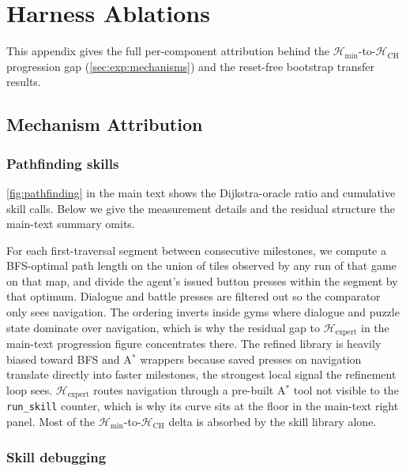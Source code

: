 \section{Harness Ablations}\label{app:ablations}

This appendix gives the full per-component attribution behind the $\mathcal{H}_{\min}$-to-$\mathcal{H}_\mathrm{CH}$ progression gap (\cref{sec:exp:mechanisms}) and the reset-free bootstrap transfer results.

\subsection{Mechanism Attribution}\label{app:mechanisms}

\subsubsection{Pathfinding skills}\label{app:mechanisms:pathfinding}

\cref{fig:pathfinding} in the main text shows the Dijkstra-oracle ratio and cumulative skill calls. Below we give the measurement details and the residual structure the main-text summary omits.

For each first-traversal segment between consecutive milestones, we compute a BFS-optimal path length on the union of tiles observed by any run of that game on that map, and divide the agent's issued button presses within the segment by that optimum. Dialogue and battle presses are filtered out so the comparator only sees navigation. The ordering inverts inside gyms where dialogue and puzzle state dominate over navigation, which is why the residual gap to $\mathcal{H}_\mathrm{expert}$ in the main-text progression figure concentrates there. The refined library is heavily biased toward BFS and A$^*$ wrappers because saved presses on navigation translate directly into faster milestones, the strongest local signal the refinement loop sees. $\mathcal{H}_\mathrm{expert}$ routes navigation through a pre-built A$^*$ tool not visible to the \texttt{run\_skill} counter, which is why its curve sits at the floor in the main-text right panel. Most of the $\mathcal{H}_{\min}$-to-$\mathcal{H}_\mathrm{CH}$ delta is absorbed by the skill library alone.

\subsubsection{Skill debugging}\label{app:mechanisms:debug}


